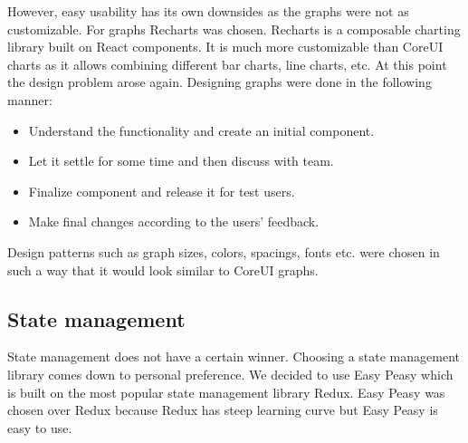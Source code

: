However, easy usability has its own downsides as the graphs were not as customizable.
For graphs Recharts was chosen.
Recharts is a composable charting library built on React components.
It is much more customizable than CoreUI charts as it allows combining different bar charts, line charts, etc.
At this point the design problem arose again.
Designing graphs were done in the following manner:
\begin{itemize}
    \item Understand the functionality and create an initial component.
    \item Let it settle for some time and then discuss with team.
    \item Finalize component and release it for test users.
    \item Make final changes according to the users' feedback.
\end{itemize}
Design patterns such as graph sizes, colors, spacings, fonts etc. were chosen in such a way that it would look similar to CoreUI graphs.

\subsection{State management}\label{subsec:state-management}
State management does not have a certain winner.
Choosing a state management library comes down to personal preference.
We decided to use Easy Peasy which is built on the most popular state management library Redux.
Easy Peasy was chosen over Redux because Redux has steep learning curve but Easy Peasy is easy to use.
